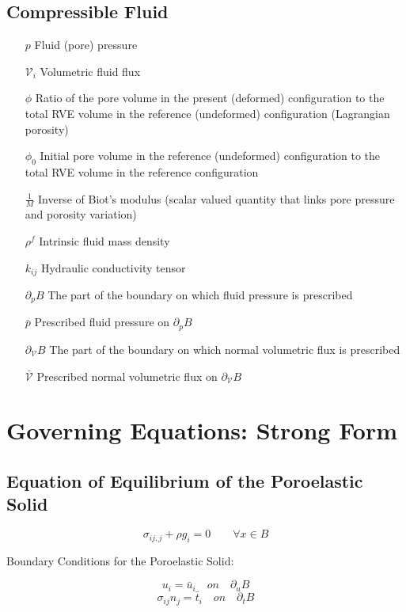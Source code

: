 \documentclass[11pt]{article} %
\begin{document}
\subsection{Compressible Fluid}

\begin{itemize}
	\item[$p$] Fluid (pore) pressure
	\item[$\mathcal{V}_i$] Volumetric fluid flux
	\item[$\phi$] Ratio of the pore volume in the present (deformed) configuration to the total RVE volume in the reference (undeformed) configuration (Lagrangian porosity)
	\item[$\phi_0$] Initial pore volume in the reference (undeformed) configuration to the total RVE volume in the reference configuration
	\item[$\frac{1}{M}$] Inverse of Biot's modulus (scalar valued quantity that links pore pressure and porosity variation)
	\item[$\rho^f$] Intrinsic fluid mass density
	\item[$k_{ij}$] Hydraulic conductivity tensor
	\item[$\partial_p B$] The part of the boundary on which fluid pressure is prescribed
	\item[$\bar{p}$] Prescribed fluid pressure on $\partial_p B$
	\item[$\partial_{\mathcal{V}} B$] The part of the boundary on which normal volumetric flux is prescribed
	\item[$\bar{\mathcal{V}}$] Prescribed normal volumetric flux on $\partial_{\mathcal{V}} B$
\end{itemize}

\newpage
\section{Governing Equations: Strong Form}

\subsection{Equation of Equilibrium of the Poroelastic Solid}

\begin{equation}
	\sigma_{ij,j} + \rho g_i = 0 \qquad \forall x \in B
\end{equation}

Boundary Conditions for the Poroelastic Solid:

\begin{equation}
	u_i = \bar{u}_i \quad on \quad \partial_u B
\end{equation}
\begin{equation}
	\sigma_{ij} n_j = \bar{t}_i \quad on \quad \partial_t B
\end{equation}
\end{document}
